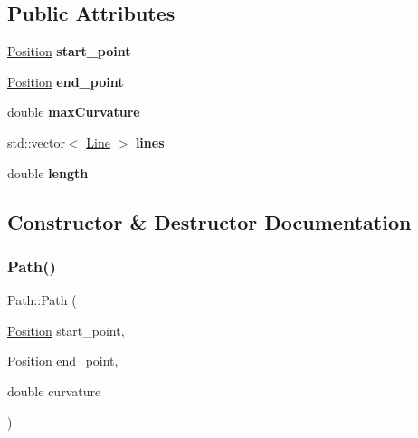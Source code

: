 \subsection*{Public Attributes}
\begin{DoxyCompactItemize}
\item 
\mbox{\label{class_path_a822c83d45ed5e336376a813c806ff66b}} 
\mbox{\hyperlink{class_position}{Position}} {\bfseries start\+\_\+point}
\item 
\mbox{\label{class_path_ab97cd4eb2fa1141118bd561c824b27cc}} 
\mbox{\hyperlink{class_position}{Position}} {\bfseries end\+\_\+point}
\item 
\mbox{\label{class_path_a181a2058e947c22fc3e25a361bb934e6}} 
double {\bfseries max\+Curvature}
\item 
\mbox{\label{class_path_a3d38eb2e010fbf82837e7d3eb5f0faba}} 
std\+::vector$<$ \mbox{\hyperlink{class_line}{Line}} $>$ {\bfseries lines}
\item 
\mbox{\label{class_path_a8ca4f648459940bdd347e52f07676473}} 
double {\bfseries length}
\end{DoxyCompactItemize}


\subsection{Constructor \& Destructor Documentation}
\mbox{\label{class_path_aeea7a8be1048b133042de6815a5c3814}} 
\subsubsection{\texorpdfstring{Path()}{Path()}}
{\footnotesize\ttfamily Path\+::\+Path (\begin{DoxyParamCaption}\item[{\mbox{\hyperlink{class_position}{Position}}}]{start\+\_\+point,  }\item[{\mbox{\hyperlink{class_position}{Position}}}]{end\+\_\+point,  }\item[{double}]{curvature }\end{DoxyParamCaption})}



